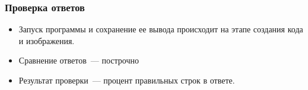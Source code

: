 \documentclass[14pt,aspectratio=169,hyperref={pdftex,unicode},xcolor=dvipsnames]{beamer}
\begin{document}
\begin{frame}
    \frametitle{Проверка ответов}
    \begin{itemize}
        \item Запуск программы и сохранение ее вывода происходит на этапе создания кода и изображения.
        \item Сравнение ответов~--- построчно
        \item Результат проверки~--- процент правильных строк в ответе.
    \end{itemize}
\end{frame}






\end{document}
